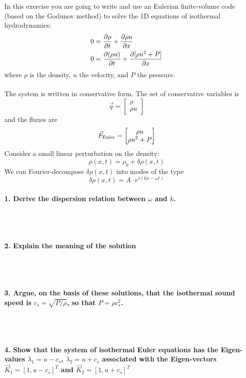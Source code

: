 In this exercise you are going to write and 
use an Eulerian finite-volume code (based on 
the Godunov method) to solve the 1D equations
of isothermal hydrodynamics:
\begin{align}
    0&=
    \frac{\partial \rho}{\partial t}+
    \frac{\partial \rho u}{\partial x} \\
    0&=
    \frac{\partial (\rho u)}{\partial t}+
    \frac{\partial [\rho u^2+P]}{\partial x} \\
\end{align}
where $\rho$ is the density, $u$ the velocity, 
and $P$ the pressure. \\
\\
The system is written in 
conservative form. The set of conservative 
variables is 
\begin{equation}
    \vec q=
    \begin{bmatrix}
        \rho \\ \rho u        
    \end{bmatrix}
\end{equation}
and the fluxes are 
\begin{equation}
    \vec F_\textnormal{Euler}=
    \begin{bmatrix}
        \rho u \\ \rho u^2+P     
    \end{bmatrix}
\end{equation}
Consider a small linear perturbation on 
the density:
\begin{equation}
    \rho(x,t)=
    \rho_0+\delta\rho(x,t)
\end{equation}
We can Fourier-decompose $\delta\rho(x,t)$
into modes of the type 
\begin{equation}
    \delta\rho(x,t)
    =A\cdot e^{i(kx-\omega t)}
\end{equation}

\paragraph{1. Derive the dispersion relation 
    between $\omega$ and $k$.
} \ \\
    \\

\paragraph{2. Explain the meaning of the 
    solution
} \ \\
    \\

\paragraph{3. Argue, on the basis of these 
    solutions, that the isothermal sound 
    speed is $c_s=\sqrt{P/\rho}$, so that 
    $P=\rho c_s^2$.
} \ \\
    \\

\paragraph{4. Show that the system of 
    isothermal Euler equations has the 
    Eigen-values $\lambda_{1}=u-c_s$,
    $\lambda_{2}=u+c_s$ associated with the 
    Eigen-vectors $\vec K_{1}=[1, u-c_s]^T$ 
    and $\vec K_{2}=[1, u+c_s]^T$
}
